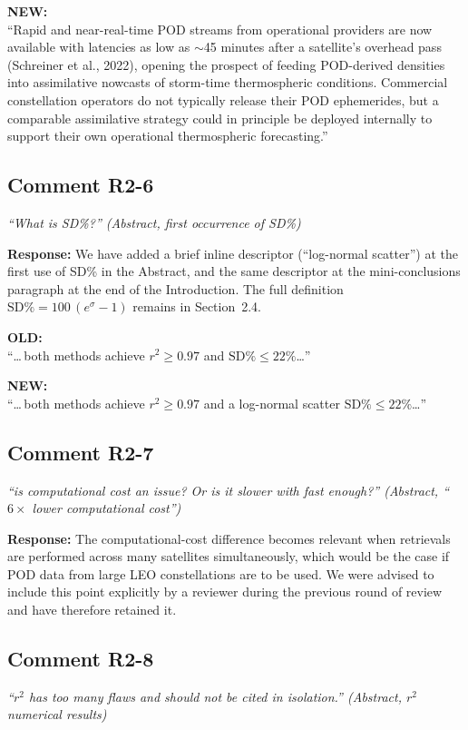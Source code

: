 \documentclass[11pt]{article}
\newcommand{\reviewercomment}[1]{%
  \medskip
  \noindent\textit{\color{reviewblue}#1}%
  \medskip
}
\newcommand{\oldtext}[1]{%
  \smallskip
  \noindent\hspace{1em}\begin{minipage}{0.92\textwidth}%
  \color{quotegray}\textbf{OLD:}\\[2pt]``#1''%
  \end{minipage}%
  \smallskip
}
\newcommand{\newtext}[1]{%
  \smallskip
  \noindent\hspace{1em}\begin{minipage}{0.92\textwidth}%
  \color{quotegreen}\textbf{NEW:}\\[2pt]``#1''%
  \end{minipage}%
  \smallskip
}
\begin{document}
\newtext{Rapid and near-real-time POD streams from operational providers are now available with latencies as low as $\sim$45 minutes after a satellite's overhead pass (Schreiner et al., 2022), opening the prospect of feeding POD-derived densities into assimilative nowcasts of storm-time thermospheric conditions. Commercial constellation operators do not typically release their POD ephemerides, but a comparable assimilative strategy could in principle be deployed internally to support their own operational thermospheric forecasting.}


\subsection{Comment R2-6}

\reviewercomment{``What is SD\%?'' (Abstract, first occurrence of SD\%)}

\textbf{Response:}
We have added a brief inline descriptor (``log-normal scatter'') at the
first use of SD\% in the Abstract, and the same descriptor at the
mini-conclusions paragraph at the end of the Introduction. The full
definition $\text{SD\%} = 100\,(e^{\sigma}-1)$ remains in Section~2.4.

\oldtext{\dots\,both methods achieve $r^{2} \geq 0.97$ and $\text{SD\%} \leq 22\%$\dots}

\newtext{\dots\,both methods achieve $r^{2} \geq 0.97$ and a log-normal scatter $\text{SD\%} \leq 22\%$\dots}


\subsection{Comment R2-7}

\reviewercomment{%
``is computational cost an issue? Or is it slower with fast enough?''
(Abstract, ``$6\times$ lower computational cost'')}

\textbf{Response:}
The computational-cost difference becomes relevant when retrievals are
performed across many satellites simultaneously, which would be the
case if POD data from large LEO constellations are to be used. We
were advised to include this point explicitly by a reviewer during
the previous round of review and have therefore retained it.


\subsection{Comment R2-8}

\reviewercomment{%
``$r^{2}$ has too many flaws and should not be cited in isolation.''
(Abstract, $r^{2}$ numerical results)}
\end{document}
